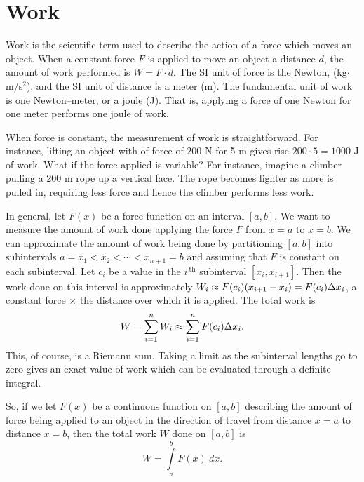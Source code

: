 \ifanalysis



\section{Work}\label{sec:work}


Work is the scientific term used to describe the action of a force which moves an object. When a constant force $F$ is applied to move an object a distance $d$, the amount of work performed is $W=F\cdot d$. The SI unit of force is the Newton, (kg$\cdot$m/s$^2$), and the SI unit of distance is a meter (m). The fundamental unit of work is one Newton--meter, or a joule (J). That is, applying a force of one Newton for one meter performs one joule of work.

When force is constant, the measurement of work is straightforward. For instance, lifting an object with of force of 200 N for 5 m gives rise $200\cdot 5 = 1000$ J of work. What if the force applied is variable? For instance, imagine a climber pulling a 200 m rope up a vertical face. The rope becomes lighter as more is pulled in, requiring less force and hence the climber performs less work.

In general, let $F(x)$ be a force function on an interval $[a,b]$. We want to measure the amount of work done applying the force $F$ from $x=a$ to $x=b$. We can approximate the amount of work being done by partitioning $[a,b]$ into subintervals $a=x_1<x_2 <\cdots <x_{n+1}=b$ and assuming that $F$ is constant on each subinterval. Let $c_i$ be a value in the $i\,^{\text{th}}$ subinterval $[x_i,x_{i+1}]$. Then the work done on this interval is approximately $W_i\approx F(c_i)(x_{i+1}-x_i) = F(c_i)\Delta x_i$, a constant force $\times$ the distance over which it is applied. The total work is 
$$ W = \sum_{i=1}^n W_i \approx \sum_{i=1}^n F(c_i)\Delta x_i.$$
This, of course, is a Riemann sum. Taking a limit as the subinterval lengths go to zero gives an exact value of work which can be evaluated through a definite integral. 


So, if we let $F(x)$ be a continuous function on $[a,b]$ describing the amount of force being applied to an object in the direction of travel from distance $x=a$ to distance $x=b$, then the total work $W$ done on $[a,b]$ is
\begin{equation}
W = \int\limits_a^b F(x)\ dx.
\label{idea:work}
\end{equation}

